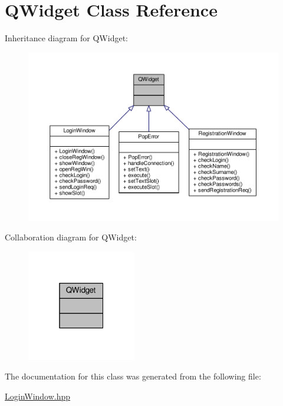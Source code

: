 \hypertarget{classQWidget}{}\section{Q\+Widget Class Reference}
\label{classQWidget}


Inheritance diagram for Q\+Widget\+:
\nopagebreak
\begin{figure}[H]
\begin{center}
\leavevmode
\includegraphics[width=350pt]{classQWidget__inherit__graph}
\end{center}
\end{figure}


Collaboration diagram for Q\+Widget\+:
\nopagebreak
\begin{figure}[H]
\begin{center}
\leavevmode
\includegraphics[width=135pt]{classQWidget__coll__graph}
\end{center}
\end{figure}


The documentation for this class was generated from the following file\+:\begin{DoxyCompactItemize}
\item 
\hyperlink{LoginWindow_8hpp}{Login\+Window.\+hpp}\end{DoxyCompactItemize}
